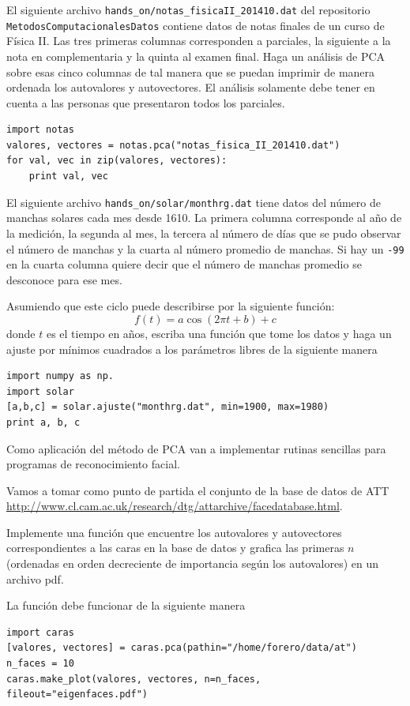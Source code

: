 \documentclass[11pt,letterpaper]{exam}
\begin{document}
\begin{questions}

 El siguiente archivo
\verb"hands_on/notas_fisicaII_201410.dat" del repositorio
\verb"MetodosComputacionalesDatos" contiene datos de notas finales de
un curso de F\'isica II. Las tres primeras columnas corresponden a
parciales, la siguiente a la nota en complementaria y la quinta al
examen final. Haga un an\'alisis de PCA sobre esas cinco columnas de
tal manera que se puedan imprimir de manera ordenada los autovalores y
autovectores. El an\'alisis solamente debe tener en cuenta a las
personas que presentaron todos los parciales.

\begin{verbatim}
import notas
valores, vectores = notas.pca("notas_fisica_II_201410.dat")
for val, vec in zip(valores, vectores):
    print val, vec
\end{verbatim}


El siguiente archivo \verb"hands_on/solar/monthrg.dat" tiene datos del
n\'umero de manchas solares cada mes desde 1610. La primera columna
corresponde al a\~no de la medici\'on, la segunda al mes, la tercera
al n\'umero de d\'ias que se pudo observar el n\'umero de manchas y la
cuarta al n\'umero promedio de manchas. Si hay un \verb"-99" en la
cuarta columna quiere decir que el n\'umero de manchas promedio se
desconoce para ese mes.

Asumiendo que este ciclo puede describirse por la siguiente funci\'on:
\begin{displaymath}
f(t) = a\cos(2\pi t + b) + c
\end{displaymath}
donde $t$ es el tiempo en a\~nos, escriba una funci\'on que tome los
datos y haga un ajuste por m\'inimos cuadrados a los par\'ametros
libres de la siguiente manera

\begin{verbatim}
import numpy as np.
import solar
[a,b,c] = solar.ajuste("monthrg.dat", min=1900, max=1980)
print a, b, c
\end{verbatim}

Como aplicaci\'on del m\'etodo de PCA van a implementar rutinas
sencillas para programas de reconocimiento facial.

Vamos a tomar como punto de partida el conjunto de la base de datos de
ATT
\url{http://www.cl.cam.ac.uk/research/dtg/attarchive/facedatabase.html}. 

Implemente una funci\'on que encuentre los autovalores y autovectores
correspondientes a las caras en la base de datos y grafica las
primeras $n$ (ordenadas en orden decreciente de importancia seg\'un
los autovalores) en un archivo pdf. 

La funci\'on debe funcionar de la siguiente manera
\begin{verbatim}
import caras
[valores, vectores] = caras.pca(pathin="/home/forero/data/at")
n_faces = 10
caras.make_plot(valores, vectores, n=n_faces, fileout="eigenfaces.pdf")
\end{verbatim}

\end{questions}
\end{document}
